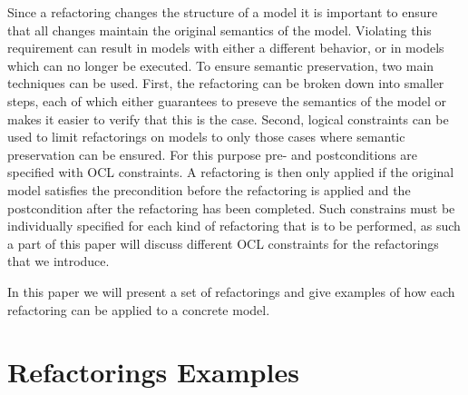 \documentclass{llncs}
\begin{document}
Since a refactoring changes the structure of a model it is important to ensure that all changes maintain the original semantics of the
model. Violating this requirement can result in models with either a different behavior, or in models which can no longer be executed.
To ensure semantic preservation, two main techniques can be used. First, the refactoring can be broken down into smaller steps, each of
which either guarantees to preseve the semantics of the model or makes it easier to verify that this is the case. Second, logical
constraints can be used to limit refactorings on models to only those cases where semantic preservation can be ensured. For this
purpose pre- and postconditions are specified with OCL constraints. A refactoring is then only applied if the original model satisfies
the precondition before the refactoring is applied and the postcondition after the refactoring has been completed. Such constrains must
be individually specified for each kind of refactoring that is to be performed, as such a part of this paper will discuss different OCL
constraints for the refactorings that we introduce.


In this paper we will present a set of refactorings and give examples of how each refactoring can be applied to a concrete model. 


\section{Refactorings Examples}
\end{document}
